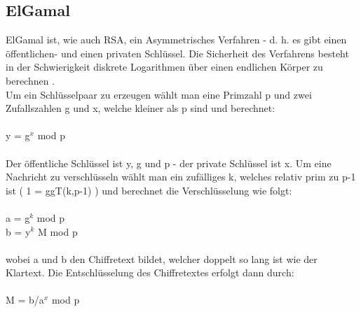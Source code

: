 \documentclass[10pt, a4paper,headsepline]{scrreprt}
\begin{document}
\subsection{ElGamal}
ElGamal ist, wie auch RSA, ein Asymmetrisches Verfahren - d. h. es gibt einen öffentlichen- und einen privaten Schlüssel. Die Sicherheit des Verfahrens besteht in der Schwierigkeit diskrete Logarithmen über einen endlichen Körper zu berechnen \citep[S. 543ff]{book:angewandte-krypto}. \\
Um ein Schlüsselpaar zu erzeugen wählt man eine Primzahl p und zwei Zufallszahlen g und x, welche kleiner als p sind und berechnet: \\ \\
y = g$^{x}$ mod p \\ \\
Der öffentliche Schlüssel ist y, g und p - der private Schlüssel ist x. Um eine Nachricht zu verschlüsseln wählt man ein zufälliges k, welches relativ prim zu p-1 ist ( 1 = ggT(k,p-1) ) und berechnet die Verschlüsselung wie folgt: \\ \\
a = g$^{k}$ mod p \\
b = y$^{k}$ M mod p \\ \\
wobei a und b den Chiffretext bildet, welcher doppelt so lang ist wie der Klartext. Die Entschlüsselung des Chiffretextes erfolgt dann durch: \\ \\
M = b/a$^{x}$ mod p \\
\end{document}
